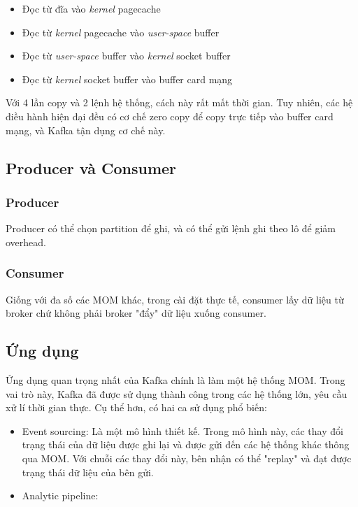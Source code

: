 \documentclass{article}
\begin{document}
\begin{itemize}
    \item Đọc từ đĩa vào \emph{kernel} pagecache
    \item Đọc từ \emph{kernel} pagecache vào \emph{user-space} buffer
    \item Đọc từ \emph{user-space} buffer vào \emph{kernel} socket buffer
    \item Đọc từ \emph{kernel} socket buffer vào buffer card mạng
\end{itemize}

Với 4 lần copy và 2 lệnh hệ thống, cách này rất mất thời gian. Tuy nhiên, các hệ
điều hành hiện đại đều có cơ chế zero copy để copy trực tiếp vào buffer card
mạng, và Kafka tận dụng cơ chế này.

\subsection{Producer và Consumer}

\subsubsection{Producer}

Producer có thể chọn partition để ghi, và có thể gửi lệnh ghi theo lô để giảm
overhead.

\subsubsection{Consumer}

Giống với đa số các MOM khác, trong cài đặt thực tế, consumer lấy dữ liệu từ
broker chứ không phải broker "đẩy" dữ liệu xuống consumer.

\subsection{Ứng dụng}

Ứng dụng quan trọng nhất của Kafka chính là làm một hệ thống MOM. Trong vai trò
này, Kafka đã được sử dụng thành công trong các hệ thống lớn, yêu cầu xử lí thời
gian thực. Cụ thể hơn, có hai ca sử dụng phổ biến:

\begin{itemize}
    \item Event sourcing: Là một mô hình thiết kế. Trong mô hình này, các thay
        đổi trạng thái của dữ liệu được ghi lại và được gửi đến các hệ thống
        khác thông qua MOM. Với chuỗi các thay đổi này, bên nhận có thể "replay"
        và đạt được trạng thái dữ liệu của bên gửi.
    \item Analytic pipeline:
\end{itemize}
\end{document}
